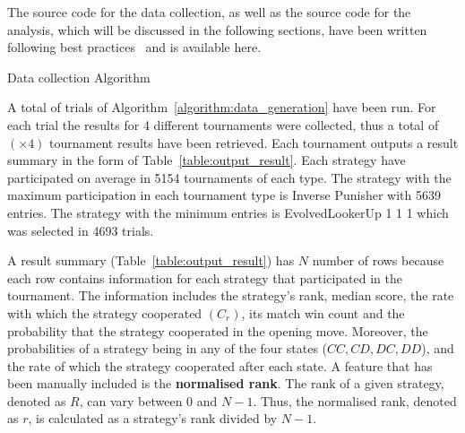 \documentclass{article}
\newcommand{\uniquenumberofseeds}{}
\newcommand{\numberofalltournaments}{}
\begin{document}
The source code for the data collection, as well as the source code for
the analysis, which will be discussed in the following sections, have been written
following best practices~\cite{Aberdour2007, Benureau2018}
and is available here. %

\begin{algorithm}[!htbp]
    \;
    \caption{Data collection Algorithm}
    \label{algorithm:data_generation}
\end{algorithm}

A total of \uniquenumberofseeds trials of Algorithm~\ref{algorithm:data_generation} have been
run. For each trial the results for 4 different tournaments were collected,
thus a total of \numberofalltournaments $(\uniquenumberofseeds \times 4)$ tournament results have been
retrieved. Each tournament outputs a result summary in the form of
Table~\ref{table:output_result}. Each strategy have participated on average in
5154 tournaments of each type. The strategy with the maximum participation in each
tournament type is Inverse Punisher with 5639 entries. The strategy with the
minimum entries is EvolvedLookerUp 1 1 1 which was selected in 4693 trials.

A result summary (Table~\ref{table:output_result}) has \(N\) number of rows
because each row contains information for each strategy that participated in the
tournament. The information includes the strategy's rank, median score, the rate
with which the strategy cooperated $(C_r)$, its match win count and the
probability that the strategy cooperated in the opening move. Moreover, the
probabilities of a strategy being in any of the four states ($CC, CD, DC, DD$),
and the rate of which the strategy cooperated after each state. A feature that
has been manually included is the \textbf{normalised rank}. The rank of a given
strategy, denoted as \(R\), can vary between 0 and \(N-1\). Thus, the normalised rank,
denoted as $r$, is calculated as a strategy's rank divided by \(N - 1\).
\end{document}
